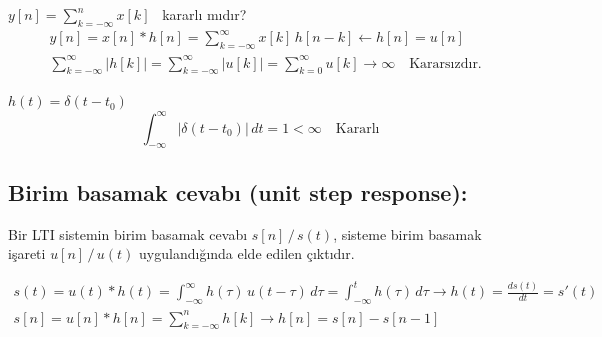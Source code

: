 \documentclass[11pt,a4paper]{article}
\begin{document}
\begin{ornek}[(Ex)]
$y[n] = \displaystyle\sum_{k=-\infty}^{n} x[k]$ \ kararlı mıdır? \hfill {}
\begin{align*}
  & y[n] = x[n] \ast h[n] = \sum_{k=-\infty}^{\infty} x[k]\,h[n-k] \longleftarrow h[n] = u[n] \\
  & \sum_{k=-\infty}^{\infty} |h[k]| = \sum_{k=-\infty}^{\infty} |u[k]| = \sum_{k=0}^{\infty} u[k] \to \infty \quad \text{Kararsızdır.}
\end{align*}
\end{ornek}

\begin{ornek}[(Ex)]
$h(t) = \delta(t-t_0)$
\[ \int_{-\infty}^{\infty} |\delta(t-t_0)|\,dt = 1 < \infty \quad \text{Kararlı} \]
\end{ornek}

\subsection{Birim basamak cevabı (unit step response):}
Bir LTI sistemin birim basamak cevabı $s[n]\,/\,s(t)$, sisteme birim basamak işareti $u[n]\,/\,u(t)$ uygulandığında elde edilen çıktıdır.
\begin{center}
\end{center}
\begin{gather*}
  s(t) = u(t) \ast h(t) = \int_{-\infty}^{\infty} h(\tau)\,u(t-\tau)\,d\tau = \int_{-\infty}^{t} h(\tau)\,d\tau \longrightarrow h(t) = \frac{ds(t)}{dt} = s'(t) \\
  s[n] = u[n] \ast h[n] = \sum_{k=-\infty}^{n} h[k] \longrightarrow h[n] = s[n] - s[n-1]
\end{gather*}
\end{document}
